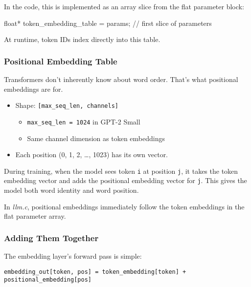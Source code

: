 \documentclass[
  letterpaper,
  DIV=11,
  numbers=noendperiod]{scrreprt}
\newenvironment{Shaded}{\begin{snugshade}}{\end{snugshade}}
\newcommand{\CommentTok}[1]{\textcolor[rgb]{0.37,0.37,0.37}{#1}}
\newcommand{\DataTypeTok}[1]{\textcolor[rgb]{0.68,0.00,0.00}{#1}}
\newcommand{\NormalTok}[1]{\textcolor[rgb]{0.00,0.23,0.31}{#1}}
\newcommand{\OperatorTok}[1]{\textcolor[rgb]{0.37,0.37,0.37}{#1}}
\providecommand{\tightlist}{%
  \setlength{\itemsep}{0pt}\setlength{\parskip}{0pt}}
\begin{document}
In the code, this is implemented as an array slice from the flat
parameter block:

\begin{Shaded}
\begin{Highlighting}[]
\DataTypeTok{float}\OperatorTok{*}\NormalTok{ token\_embedding\_table }\OperatorTok{=}\NormalTok{ params}\OperatorTok{;}  \CommentTok{// first slice of parameters}
\end{Highlighting}
\end{Shaded}

At runtime, token IDs index directly into this table.

\subsubsection{Positional Embedding
Table}\label{positional-embedding-table}

Transformers don't inherently know about word order. That's what
positional embeddings are for.

\begin{itemize}
\item
  Shape: \texttt{{[}max\_seq\_len,\ channels{]}}

  \begin{itemize}
  \tightlist
  \item
    \texttt{max\_seq\_len\ =\ 1024} in GPT-2 Small
  \item
    Same channel dimension as token embeddings
  \end{itemize}
\item
  Each position (0, 1, 2, \ldots, 1023) has its own vector.
\end{itemize}

During training, when the model sees token \texttt{i} at position
\texttt{j}, it takes the token embedding vector and adds the positional
embedding vector for \texttt{j}. This gives the model both word identity
and word position.

In \emph{llm.c}, positional embeddings immediately follow the token
embeddings in the flat parameter array.

\subsubsection{Adding Them Together}\label{adding-them-together}

The embedding layer's forward pass is simple:

\begin{verbatim}
embedding_out[token, pos] = token_embedding[token] + positional_embedding[pos]
\end{verbatim}
\end{document}
